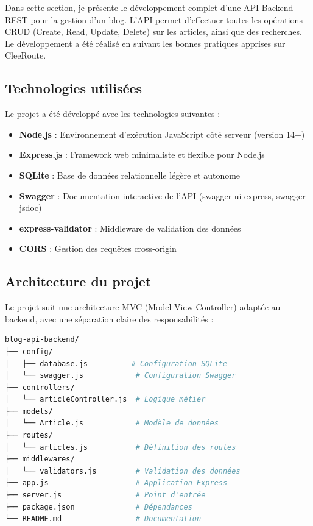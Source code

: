 \documentclass[12pt,a4paper]{article}
\begin{document}
Dans cette section, je présente le développement complet d'une API Backend REST pour la gestion d'un blog. L'API permet d'effectuer toutes les opérations CRUD (Create, Read, Update, Delete) sur les articles, ainsi que des recherches. Le développement a été réalisé en suivant les bonnes pratiques apprises sur CleeRoute.

\subsection{Technologies utilisées}

Le projet a été développé avec les technologies suivantes :

\begin{itemize}
    \item \textbf{Node.js} : Environnement d'exécution JavaScript côté serveur (version 14+)
    \item \textbf{Express.js} : Framework web minimaliste et flexible pour Node.js
    \item \textbf{SQLite} : Base de données relationnelle légère et autonome
    \item \textbf{Swagger} : Documentation interactive de l'API (swagger-ui-express, swagger-jsdoc)
    \item \textbf{express-validator} : Middleware de validation des données
    \item \textbf{CORS} : Gestion des requêtes cross-origin
\end{itemize}

\subsection{Architecture du projet}

Le projet suit une architecture MVC (Model-View-Controller) adaptée au backend, avec une séparation claire des responsabilités :

\begin{lstlisting}[language=bash, caption=Structure du projet]
blog-api-backend/
├── config/
│   ├── database.js          # Configuration SQLite
│   └── swagger.js            # Configuration Swagger
├── controllers/
│   └── articleController.js  # Logique métier
├── models/
│   └── Article.js            # Modèle de données
├── routes/
│   └── articles.js           # Définition des routes
├── middlewares/
│   └── validators.js         # Validation des données
├── app.js                    # Application Express
├── server.js                 # Point d'entrée
├── package.json              # Dépendances
└── README.md                 # Documentation
\end{lstlisting}
\end{document}
